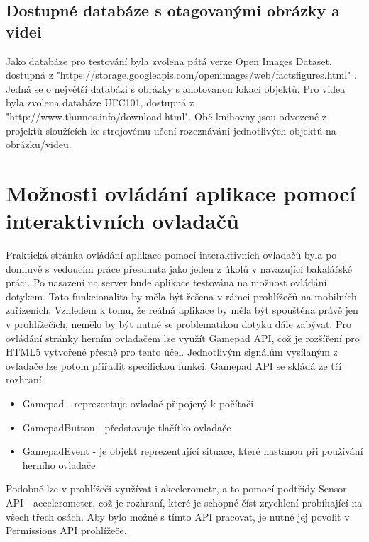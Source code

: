 \subsection{Dostupné databáze s otagovanými obrázky a videi}
Jako databáze pro testování byla zvolena pátá verze Open Images Dataset, dostupná z "https://storage.googleapis.com/openimages/web/factsfigures.html" . Jedná se o největší databázi s obrázky s anotovanou lokací objektů. Pro videa byla zvolena databáze UFC101, dostupná z "http://www.thumos.info/download.html". Obě knihovny jsou odvozené z projektů sloužících ke strojovému učení rozeznávání jednotlivých objektů na obrázku/videu.


\section{Možnosti ovládání aplikace pomocí interaktivních ovladačů}
Praktická stránka ovládání aplikace pomocí interaktivních ovladačů byla po domluvě s vedoucím práce přesunuta jako jeden z úkolů v navazující bakalářské práci. Po nasazení na server bude aplikace testována na možnost ovládání dotykem. Tato funkcionalita by měla být řešena v rámci prohlížečů na mobilních zařízeních. Vzhledem k tomu, že reálná aplikace by měla být spouštěna právě jen v prohlížečích, nemělo by být nutné se problematikou dotyku dále zabývat. Pro ovládání stránky herním ovladačem lze využít Gamepad API, což je rozšíření pro HTML5 vytvořené přesně pro tento účel. Jednotlivým signálům vysílaným z ovladače lze potom přiřadit specifickou funkci. Gamepad API se skládá ze tří rozhraní. \cite{game}

\begin{itemize}
\item Gamepad - reprezentuje ovladač připojený k počítači
\item GamepadButton - představuje tlačítko ovladače
\item GamepadEvent - je objekt reprezentující situace, které nastanou při používání herního ovladače
\end{itemize}

Podobně lze v prohlížeči využívat i akcelerometr, a to pomocí podtřídy Sensor API - accelerometer, což je rozhraní, které je schopné číst zrychlení probíhající na všech třech osách. Aby bylo možné s tímto API pracovat, je nutné jej povolit v Permissions API prohlížeče.\cite{Akcel}

